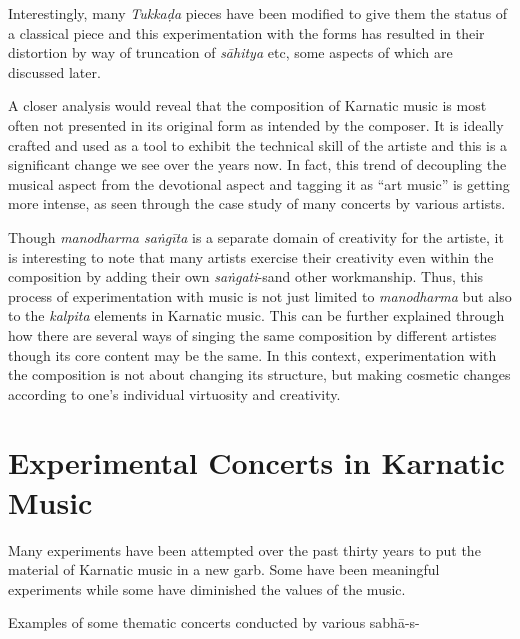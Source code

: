 Interestingly, many \textit{Tukkaḍa} pieces have been modified to give them the status of a classical piece and this experimentation with the forms has resulted in their distortion by way of truncation of \textit{sāhitya} etc, some aspects of which are discussed later.

A closer analysis would reveal that the composition of Karnatic music is most often not presented in its original form as intended by the composer. It is ideally crafted and used as a tool to exhibit the technical skill of the artiste and this is a significant change we see over the years now. In fact, this trend of decoupling the musical aspect from the devotional aspect and tagging it as “art music” is getting more intense, as seen through the case study of many concerts by various artists.

Though \textit{manodharma saṅgīta} is a separate domain of creativity for the artiste, it is interesting to note that many artists exercise their creativity even within the composition by adding their own \textit{saṅgati}-s\break and other workmanship. Thus, this process of experimentation with music is not just limited to \textit{manodharma} but also to the \textit{kalpita} elements in Karnatic music. This can be further explained through how there are several ways of singing the same composition by different artistes though its core content may be the same. In this context, experimentation with the composition is not about changing its structure, but making cosmetic changes according to one’s individual virtuosity and creativity.


\section*{Experimental Concerts in Karnatic Music}

Many experiments have been attempted over the past thirty years to put the material of Karnatic music in a new garb. Some have been meaningful experiments while some have diminished the values of the music.

Examples of some thematic concerts conducted by various sabhā-s-

